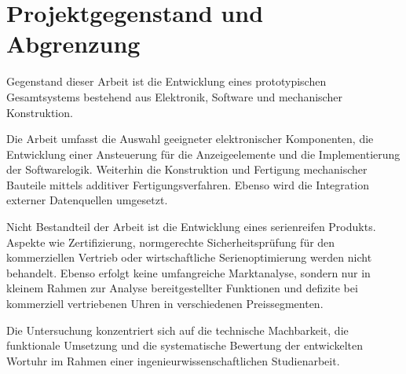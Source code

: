 \section{Projektgegenstand und Abgrenzung}
Gegenstand dieser Arbeit ist die Entwicklung eines prototypischen Gesamtsystems bestehend aus Elektronik, Software und 
mechanischer Konstruktion. 

Die Arbeit umfasst die Auswahl geeigneter elektronischer Komponenten, die Entwicklung einer Ansteuerung für die Anzeigeelemente und die Implementierung der Softwarelogik.
Weiterhin die Konstruktion und Fertigung mechanischer Bauteile mittels additiver Fertigungsverfahren. 
Ebenso wird die Integration externer Datenquellen umgesetzt. 

Nicht Bestandteil der Arbeit ist die Entwicklung eines serienreifen Produkts. 
Aspekte wie Zertifizierung, normgerechte Sicherheitsprüfung für den kommerziellen Vertrieb oder wirtschaftliche Serienoptimierung werden nicht behandelt. 
Ebenso erfolgt keine umfangreiche Marktanalyse, sondern nur in kleinem Rahmen zur Analyse bereitgestellter Funktionen und defizite bei kommerziell vertriebenen Uhren in verschiedenen Preissegmenten.

Die Untersuchung konzentriert sich auf die technische Machbarkeit, die funktionale Umsetzung und die systematische Bewertung der entwickelten Wortuhr im Rahmen einer ingenieurwissenschaftlichen Studienarbeit.